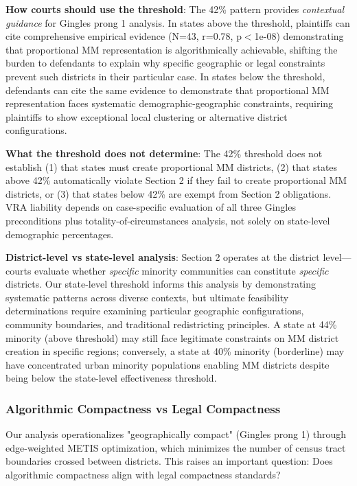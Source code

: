 \textbf{How courts should use the threshold}: The 42\% pattern provides \emph{contextual guidance} for Gingles prong 1 analysis. In states above the threshold, plaintiffs can cite comprehensive empirical evidence (N=43, r=0.78, p$<$1e-08) demonstrating that proportional MM representation is algorithmically achievable, shifting the burden to defendants to explain why specific geographic or legal constraints prevent such districts in their particular case. In states below the threshold, defendants can cite the same evidence to demonstrate that proportional MM representation faces systematic demographic-geographic constraints, requiring plaintiffs to show exceptional local clustering or alternative district configurations.

\textbf{What the threshold does not determine}: The 42\% threshold does not establish (1) that states must create proportional MM districts, (2) that states above 42\% automatically violate Section 2 if they fail to create proportional MM districts, or (3) that states below 42\% are exempt from Section 2 obligations. VRA liability depends on case-specific evaluation of all three Gingles preconditions plus totality-of-circumstances analysis, not solely on state-level demographic percentages.

\textbf{District-level vs state-level analysis}: Section 2 operates at the district level---courts evaluate whether \emph{specific} minority communities can constitute \emph{specific} districts. Our state-level threshold informs this analysis by demonstrating systematic patterns across diverse contexts, but ultimate feasibility determinations require examining particular geographic configurations, community boundaries, and traditional redistricting principles. A state at 44\% minority (above threshold) may still face legitimate constraints on MM district creation in specific regions; conversely, a state at 40\% minority (borderline) may have concentrated urban minority populations enabling MM districts despite being below the state-level effectiveness threshold.

\subsubsection{Algorithmic Compactness vs Legal Compactness}

Our analysis operationalizes "geographically compact" (Gingles prong 1) through edge-weighted METIS optimization, which minimizes the number of census tract boundaries crossed between districts. This raises an important question: Does algorithmic compactness align with legal compactness standards?

